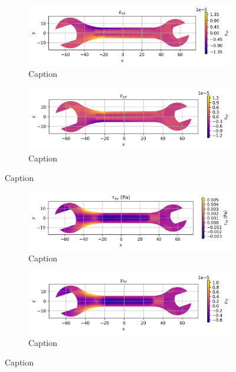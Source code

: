 \documentclass{article}  %
\begin{document}
\begin{figure}[H]
  \centering
  \begin{subfigure}[t]{0.49\textwidth}
    \centering
    \includegraphics[width=\textwidth]{GRAFICOS/Case d - epsilon_xx.png}
    \caption{Caption}
    \label{fig:deformada_reacciones}
  \end{subfigure}
  \hfill
  \begin{subfigure}[t]{0.49\textwidth}
    \centering
    \includegraphics[width=\textwidth]{GRAFICOS/Case d - epsilon_yy.png}
    \caption{Caption}
    \label{fig:von_mises}
  \end{subfigure}
  \caption{Caption}
  \label{fig:analisis_estructural}
\end{figure}

\begin{figure}[H]
  \centering
  \begin{subfigure}[t]{0.49\textwidth}
    \centering
    \includegraphics[width=\textwidth]{GRAFICOS/Case d - tau_xy.png}
    \caption{Caption}
    \label{fig:deformada_reacciones}
  \end{subfigure}
  \hfill
  \begin{subfigure}[t]{0.49\textwidth}
    \centering
    \includegraphics[width=\textwidth]{GRAFICOS/Case d - gamma_xy.png}
    \caption{Caption}
    \label{fig:von_mises}
  \end{subfigure}
  \caption{Caption}
  \label{fig:analisis_estructural}
\end{figure}
\end{document}
